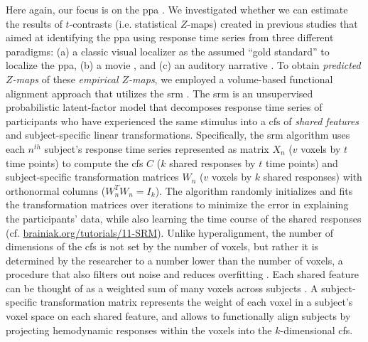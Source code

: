 Here again, our focus is on the \ac{ppa} \citep[e.g.,][for
reviews]{epstein2014neural, aminoff2013role}.
%
We investigated whether we can estimate the results of $t$-contrasts (i.e.
statistical $Z$-maps) created in previous studies that aimed at identifying the
\ac{ppa} using response time series from three different paradigms:
%
(a) a classic visual localizer \citep{sengupta2016extension} as the assumed
``gold standard'' to localize the \ac{ppa},
%
(b) a movie \citep{haeusler2022processing}, and
%
(c) an auditory narrative \citep{haeusler2022processing}.
%
To obtain \textit{predicted $Z$-maps} of these \textit{empirical $Z$-maps}, we
employed a volume-based functional alignment approach that utilizes the \ac{srm}
\citep{chen2015reduced, richard2019fast}.
The \ac{srm} is an unsupervised probabilistic latent-factor model that
decomposes response time series of participants who have experienced the same
stimulus into a \ac{cfs} of \textit{shared features} \citep[also known as
\textit{shared feature space};][]{chen2015reduced} and subject-specific linear
transformations.
Specifically, the \ac{srm} algorithm uses each $n^{th}$ subject's response time
series represented as matrix $X_{n}$ ({$v$} voxels by $t$ time points) to
compute the \ac{cfs} $C$ ($k$ shared responses by $t$ time points) and
subject-specific transformation matrices $W_{n}$ ($v$ voxels by $k$ shared
responses) with orthonormal columns ($W_{n}^{T}W_{n}=I_{k}$).
The algorithm randomly initializes and fits the transformation matrices over
iterations to minimize the error in explaining the participants' data, while
also learning the time course of the shared responses (cf.
\href{https://brainiak.org/tutorials/11-SRM/}{\url{brainiak.org/tutorials/11-SRM}}).
Unlike hyperalignment, the number of dimensions of the \ac{cfs} is not set by
the number of voxels, but rather it is determined by the researcher to a number
lower than the number of voxels, a procedure that also filters out noise and
reduces overfitting \citep{chen2015reduced}.
Each shared feature can be thought of as a weighted sum of many voxels across
subjects \citep{kumar2020brainiak}.
A subject-specific transformation matrix represents the weight of each voxel in
a subject's voxel space on each shared feature, and allows to functionally align
subjects by projecting hemodynamic responses within the voxels into the
$k$-dimensional \ac{cfs}.

